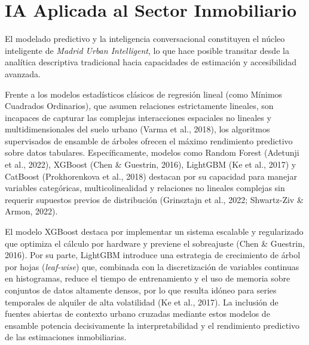 \documentclass[a4paper,11pt,openany]{book}
\begin{document}
\section{IA Aplicada al Sector Inmobiliario}
El modelado predictivo y la inteligencia conversacional constituyen el núcleo inteligente de \textit{Madrid Urban Intelligent}, lo que hace posible transitar desde la analítica descriptiva tradicional hacia capacidades de estimación y accesibilidad avanzada.

Frente a los modelos estadísticos clásicos de regresión lineal (como Mínimos Cuadrados Ordinarios), que asumen relaciones estrictamente lineales, son incapaces de capturar las complejas interacciones espaciales no lineales y multidimensionales del suelo urbano (Varma et al., 2018), los algoritmos supervisados de ensamble de árboles ofrecen el máximo rendimiento predictivo sobre datos tabulares. Específicamente, modelos como Random Forest (Adetunji et al., 2022), XGBoost (Chen \& Guestrin, 2016), LightGBM (Ke et al., 2017) y CatBoost (Prokhorenkova et al., 2018) destacan por su capacidad para manejar variables categóricas, multicolinealidad y relaciones no lineales complejas sin requerir supuestos previos de distribución (Grinsztajn et al., 2022; Shwartz-Ziv \& Armon, 2022).

El modelo XGBoost destaca por implementar un sistema escalable y regularizado que optimiza el cálculo por hardware y previene el sobreajuste (Chen \& Guestrin, 2016). Por su parte, LightGBM introduce una estrategia de crecimiento de árbol por hojas (\textit{leaf-wise}) que, combinada con la discretización de variables continuas en histogramas, reduce el tiempo de entrenamiento y el uso de memoria sobre conjuntos de datos altamente densos, por lo que resulta idóneo para series temporales de alquiler de alta volatilidad (Ke et al., 2017). La inclusión de fuentes abiertas de contexto urbano cruzadas mediante estos modelos de ensamble potencia decisivamente la interpretabilidad y el rendimiento predictivo de las estimaciones inmobiliarias.
\end{document}
